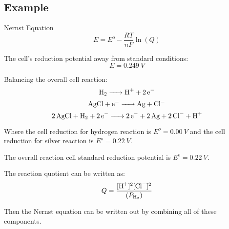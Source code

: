 \documentclass{article}
\begin{document}
\subsection{Example}

Nernst Equation
$$E = E^o - \frac{RT}{nF}\ln(Q)$$

The cell's reduction potential away from standard conditions:
$$E = 0.249\ \si{V}$$

Balancing the overall cell reaction:
$$\ce{H_2 -> H+ + 2e-}$$
$$\ce{AgCl + e- -> Ag + Cl-}$$
$$\ce{2AgCl + H_2 + 2e- -> 2e- + 2Ag + 2Cl- + H+}$$

Where the cell reduction for hydrogen reaction is $E^o = 0.00\ \si{V}$ and the
cell reduction for silver reaction is $E^o = 0.22\ \si{V}$.

The overall reaction cell standard reduction potential is $E^o = 0.22\ \si{V}$.

The reaction quotient can be written as:
$$Q = \frac{[\ce{H+}]^2[\ce{Cl-}]^2}{(P_{\ce{H_2}})}$$

Then the Nernst equation can be written out by combining all of these
components.
\end{document}
